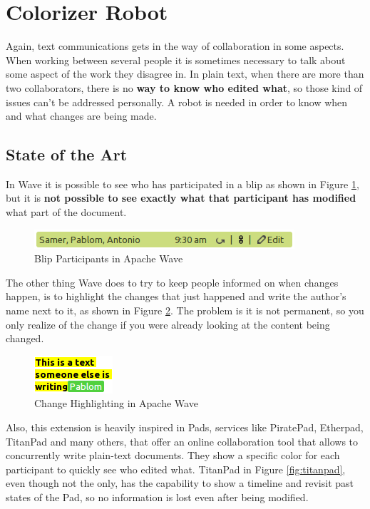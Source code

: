 \section{Colorizer Robot}
Again, text communications gets in the way of collaboration in some aspects. When working between several people it is sometimes necessary to talk about some aspect of the work they disagree in. In plain text, when there are more than two collaborators, there is no \textbf{way to know who edited what}, so those kind of issues can't be addressed personally. A robot is needed in order to know when and what changes are being made.

\label{subsec:color_soa}
\subsection{State of the Art}
In Wave it is possible to see who has participated in a blip as shown in Figure \ref{fig:participants}, but it is \textbf{not possible to see exactly what that participant has modified} what part of the document.
\begin{figure}[H]
  \center
    \includegraphics[keepaspectratio, scale=0.7]{Media/Captures/Wave/Participants.png}
  \caption{Blip Participants in Apache Wave}
  \label{fig:participants}
\end{figure}
The other thing Wave does to try to keep people informed on when changes happen, is to highlight the changes that just happened and write the author's name next to it, as shown in Figure \ref{fig:participants2}. The problem is it is not permanent, so you only realize of the change if you were already looking at the content being changed.
\begin{figure}[H]
  \center
    \includegraphics[keepaspectratio, scale=0.7]{Media/Captures/Wave/Participants2.png}
  \caption{Change Highlighting in Apache Wave}
  \label{fig:participants2}
\end{figure}
Also, this extension is heavily inspired in Pads, services like PiratePad, Etherpad, TitanPad and many others, that offer an online collaboration tool that allows to concurrently write plain-text documents. They show a specific color for each participant to quickly see who edited what. TitanPad in Figure \ref{fig:titanpad}, even though not the only, has the capability to show a timeline and revisit past states of the Pad, so no information is lost even after being modified.
